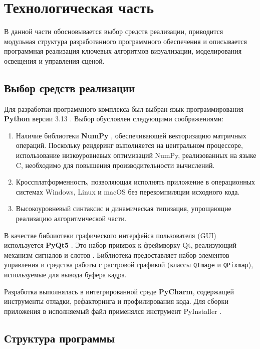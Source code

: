 \chapter{Технологическая часть}

В данной части обосновывается выбор средств реализации, приводится модульная структура разработанного программного обеспечения и описывается программная реализация ключевых алгоритмов визуализации, моделирования освещения и управления сценой.

\section{Выбор средств реализации}

Для разработки программного комплекса был выбран язык программирования \textbf{Python} версии 3.13 \cite{python_docs}. Выбор обусловлен следующими соображениями:
\begin{enumerate}
	\item Наличие библиотеки \textbf{NumPy} \cite{numpy_docs}, обеспечивающей векторизацию матричных операций. Поскольку рендеринг выполняется на центральном процессоре, использование низкоуровневых оптимизаций NumPy, реализованных на языке C, необходимо для повышения производительности вычислений.
	\item Кроссплатформенность, позволяющая исполнять приложение в операционных системах Windows, Linux и macOS без перекомпиляции исходного кода.
	\item Высокоуровневый синтаксис и динамическая типизация, упрощающие реализацию алгоритмической части.
\end{enumerate}

В качестве библиотеки графического интерфейса пользователя (GUI) используется \textbf{PyQt5} \cite{pyqt_docs}. Это набор привязок к фреймворку Qt, реализующий механизм сигналов и слотов \cite{qt_official}. Библиотека предоставляет набор элементов управления и средства работы с растровой графикой (классы \texttt{QImage} и \texttt{QPixmap}), используемые для вывода буфера кадра.

Разработка выполнялась в интегрированной среде \textbf{PyCharm}, содержащей инструменты отладки, рефакторинга и профилирования кода. Для сборки приложения в исполняемый файл применялся инструмент PyInstaller \cite{pyinstaller_docs}.

\section{Структура программы}

